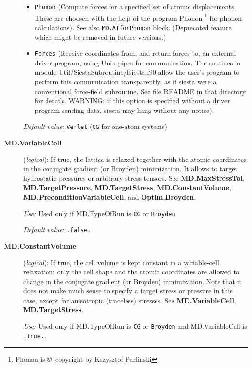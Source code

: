 \documentclass[11pt]{article}
\begin{document}
\begin{description}
\begin{itemize}
\item {\tt Phonon} (Compute forces for a specified set of atomic
displacements. These are choosen with the help of the program {\sc
Phonon} \footnote{{\sc Phonon} is \copyright\ copyright by Krzysztof
Parlinski}    for phonon calculations). See
also {\tt MD.ATforPhonon} block. (Deprecated feature which might be
removed in future versions.)

\item {\tt Forces} (Receive coordinates from, and return forces to,
an external driver program, using Unix pipes for communication.
The routines in module Util/SiestaSubroutine/fsiesta.f90 allow the
user's program to perform this communication transparently, as if
siesta were a conventional force-field subroutine. See file README
in that directory for details. WARNING: if this option is specified
without a driver program sending data, siesta may hang without
any notice).
\end{itemize}
    
{\it Default value:} {\tt Verlet} ({\tt CG} for one-atom systems)


\item[{\bf MD.VariableCell}] ({\it logical}):
 
If true, the lattice is relaxed together with the atomic coordinates
in the conjugate gradient (or Broyden) minimization. It allows to target
hydrostatic pressures or arbitrary stress tensors.  See {\bf
MD.MaxStressTol}, {\bf MD.TargetPressure}, {\bf MD.TargetStress}, {\bf
  MD.ConstantVolume}, {\bf MD.PreconditionVariableCell}, and {\bf Optim.Broyden}.

{\it Use:} Used only if MD.TypeOfRun is {\tt CG} or {\tt Broyden}

{\it Default value:} {\tt .false.}

\item[{\bf MD.ConstantVolume}] ({\it logical}):
If true, the cell volume is kept constant in a variable-cell
relaxation: only the cell shape and the atomic coordinates are allowed
to change in the conjugate gradient (or Broyden) minimization. 
Note that it does not make much sense to specify a target stress or
pressure in this case, except for anisotropic (traceless) stresses.
See {\bf MD.VariableCell}, {\bf MD.TargetStress}.

{\it Use:} Used only if MD.TypeOfRun is {\tt CG} or {\tt Broyden}  and
 MD.VariableCell is
 {\tt .true.}. 


\end{description}
\end{document}
